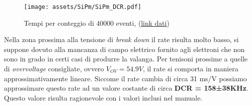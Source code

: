 \begin{figure}[!h]
    \centering
    \texttt{[image: assets/SiPm/SiPm\_DCR.pdf]}
    \caption{Tempi per conteggio di 40000 eventi, (\href{https://github.com/Yedi278/Esperimentazioni-Elettronica/tree/main/SiPm/Caratterizzazione\%20Hamamatsu}{link dati})}
\end{figure}

Nella zona prossima alla tensione di \textit{break down} il rate risulta molto basso, si suppone dovuto alla mancanza di campo elettrico fornito agli elettroni che non sono in grado in certi casi di produrre la valanga. Per tenisoni prossime a quelle di \textit{overvoltage} consigliate, ovvero $V_{OV} = 54.9V$, il rate si comporta in maniera approssimativamente lineare. Siccome il rate cambia di circa 31 ms/V possiamo approssimare questo rate ad un valore costante di circa \textbf{DCR = 158±38KHz}.
Questo valore risulta ragionevole con i valori inclusi nel manuale.